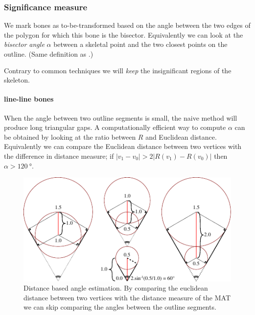 \subsubsection{Significance measure}\label{sec:significance_measure}
We mark bones as to-be-transformed based on the angle between the two edges of the polygon for which this bone is the bisector.
Equivalently we can look at the \emph{bisector angle} $\alpha$ between a skeletal point and the two closest points on the outline.
(Same definition as \cite{attali1996modeling}.)

Contrary to common techniques we will \emph{keep} the insignificant regions of the skeleton.

\paragraph{line-line bones}
When the angle between two outline segments is small, the naive method will produce long triangular gaps.
A computationally efficient way to compute $\alpha$ can be obtained by looking at the ratio between $R$ and Euclidean distance.
Equivalently we can compare the Euclidean distance between two vertices with the difference in distance measure;
if $ |v_1 - v_0| > 2 | R(v_1) - R(v_0) |$ then $\alpha > \SI{120}{\degree}$.

\begin{figure}[H]
\centering
\includegraphics[width=.9\columnwidth]{sources/method/distance_based_angles.pdf}
\caption{Distance based angle estimation. By comparing the euclidean distance between two vertices with the distance measure of the MAT we can skip comparing the angles between the outline segments.}
\label{distance_based_angles}
\end{figure}

